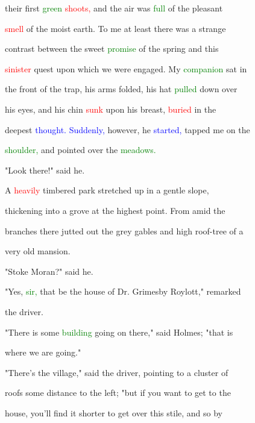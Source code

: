  their first \textcolor{green}{green} \textcolor{red}{shoots,} and the air was \textcolor{green}{full} of the \textcolor{BurntOrange}{pleasant}

 \textcolor{red}{smell} of the moist earth. To me at least there was a strange

 contrast between the \textcolor{BurntOrange}{sweet} \textcolor{green}{promise} of the spring and this

 \textcolor{red}{sinister} \textcolor{BurntOrange}{quest} upon which we were engaged. My \textcolor{green}{companion} sat in

 the front of the trap, his arms folded, his hat \textcolor{green}{pulled} down over

 his eyes, and his chin \textcolor{red}{sunk} upon his breast, \textcolor{red}{buried} in the

 deepest \textcolor{blue}{thought.} \textcolor{blue}{Suddenly,} however, he \textcolor{blue}{started,} tapped me on the

 \textcolor{green}{shoulder,} and pointed over the \textcolor{green}{meadows.}



 "Look there!" said he.



 A \textcolor{red}{heavily} timbered park stretched up in a gentle slope,

 thickening into a grove at the highest point. From amid the

 branches there jutted out the grey gables and high roof-tree of a

 very old mansion.



 "Stoke Moran?" said he.



 "Yes, \textcolor{green}{sir,} that be the house of Dr. Grimesby Roylott," remarked

 the driver.



 "There is some \textcolor{green}{building} going on there," said Holmes; "that is

 where we are going."



 "There's the village," said the driver, pointing to a cluster of

 roofs some distance to the left; "but if you want to get to the

 house, you'll find it shorter to get over this stile, and so by

